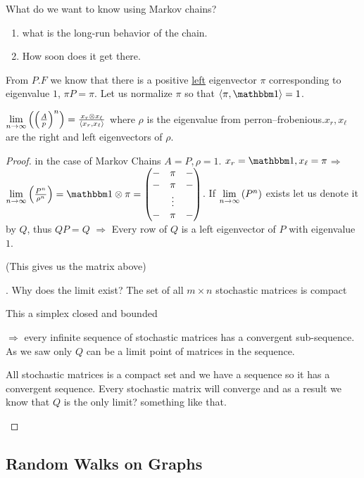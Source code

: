 What do we want to know using Markov chains?
\begin{enumerate}
\item what is the long-run behavior of the chain.
\item How soon does it get there.
\end{enumerate}
%
From $P.F$ we know that there is a positive \uline{left} eigenvector
$\pi$ corresponding to eigenvalue $1$, $\pi P=\pi$. Let us normalize
$\pi$ so that $\left\langle \pi,\one\right\rangle =1$.
\begin{thm}
 $\lim\limits _{n\to\infty}\left(\left(\frac{A}{p}\right)^{n}\right)=\frac{x_{r}\otimes x_{\ell}}{\left\langle x_{r},x_{\ell}\right\rangle }$
where $\rho$ is the eigenvalue from perron--frobenious.$x_{r},x_{\ell}$
are the right and left eigenvectors of $\rho$.
\end{thm}

\begin{proof}
in the case of Markov Chains $A=P,\rho=1$. $x_{r}=\one,x_{\ell}=\pi$$\Rightarrow$
$\limn{\frac{P^{n}}{\rho^{n}}}=\one\otimes\pi=\begin{pmatrix}- & \pi & -\\
- & \pi & -\\
 & \vdots\\
- & \pi & -
\end{pmatrix}$. If $\lim\limits _{n\to\infty}\left(P^{n}\right)$ exists let us denote it by $Q$, thus $QP=Q$
$\Rightarrow$ Every row of $Q$ is a left eigenvector of $P$ with
eigenvalue $1$. %
\begin{insight}
(This gives us the matrix above)%
\end{insight}
. Why does the limit exist? The set of all $m\times n$ stochastic
matrices is compact %
\begin{insight}
This a simplex closed and bounded%
\end{insight}
$\Rightarrow$ every infinite sequence of stochastic matrices has
a convergent sub-sequence. As we saw only $Q$ can be a limit point
of matrices in the sequence. %
\begin{insight}
All stochastic matrices is a compact set and we have a sequence so
it has a convergent sequence. Every stochastic matrix will converge
and as a result we know that $Q$ is the only limit? something like
that.%
\end{insight}
\end{proof}
%

\subsection{Random Walks on Graphs}

